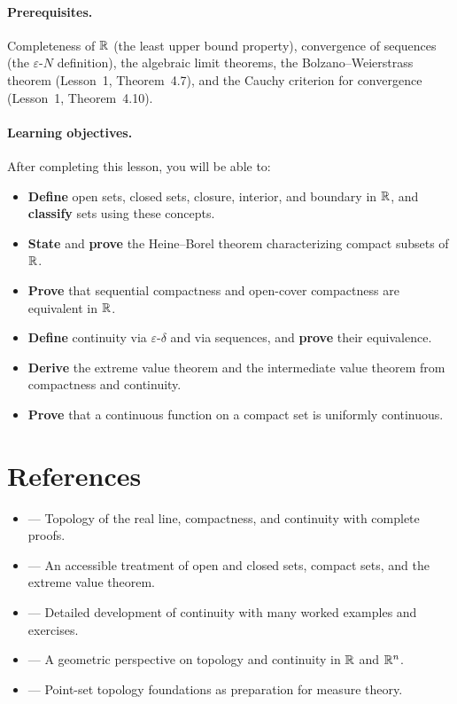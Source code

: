 \documentclass[11pt,a4paper]{article}
\begin{document}
\paragraph{Prerequisites.}
Completeness of $\mathbb{R}$ (the least upper bound property), convergence of
sequences (the $\varepsilon$-$N$ definition), the algebraic limit theorems,
the Bolzano--Weierstrass theorem (Lesson~1, Theorem~4.7), and the Cauchy
criterion for convergence (Lesson~1, Theorem~4.10).

\paragraph{Learning objectives.}
After completing this lesson, you will be able to:
\begin{itemize}[nosep]
  \item \textbf{Define} open sets, closed sets, closure, interior, and
    boundary in $\mathbb{R}$, and \textbf{classify} sets using these concepts.
  \item \textbf{State} and \textbf{prove} the Heine--Borel theorem
    characterizing compact subsets of $\mathbb{R}$.
  \item \textbf{Prove} that sequential compactness and open-cover
    compactness are equivalent in $\mathbb{R}$.
  \item \textbf{Define} continuity via $\varepsilon$-$\delta$ and via
    sequences, and \textbf{prove} their equivalence.
  \item \textbf{Derive} the extreme value theorem and the intermediate
    value theorem from compactness and continuity.
  \item \textbf{Prove} that a continuous function on a compact set is
    uniformly continuous.
\end{itemize}

\section{References}
\label{sec:references}

\begin{itemize}
  \item \citet[Chapters 2 and 4]{rudin1976} --- Topology of the real line,
    compactness, and continuity with complete proofs.
  \item \citet[Chapters 3--4]{abbott2015} --- An accessible treatment of
    open and closed sets, compact sets, and the extreme value theorem.
  \item \citet[Chapter 4]{bartle2011} --- Detailed development of
    continuity with many worked examples and exercises.
  \item \citet[Chapters 2--3]{pugh2015} --- A geometric perspective on
    topology and continuity in $\mathbb{R}$ and $\mathbb{R}^n$.
  \item \citet[Chapter 1]{folland1999} --- Point-set topology foundations
    as preparation for measure theory.
\end{itemize}
\end{document}
